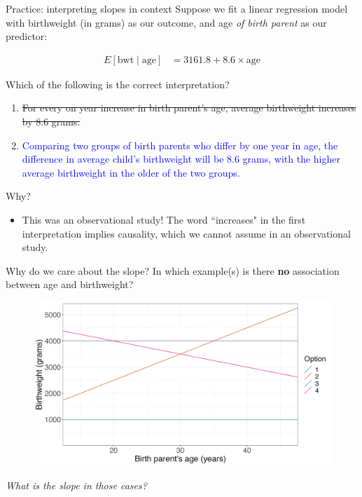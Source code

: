 \documentclass[10pt,t]{beamer}
\begin{document}
\begin{frame}{Practice: interpreting slopes in context}
Suppose we fit a linear regression model with birthweight (in grams) as our outcome, and age \textit{of birth parent} as our predictor:

\begin{align*}
E[\text{bwt} \mid \text{age}] & = 3161.8 + 8.6 \times \text{age}
\end{align*}

Which of the following is the correct interpretation?

\begin{enumerate}
	\item \sout{For every on year increase in birth parent's age, average birthweight increases by 8.6 grams.}
	\item \textcolor{blue}{Comparing two groups of birth parents who differ by one year in age, the difference in average child's birthweight will be 8.6 grams, with the higher average birthweight in the older of the two groups.}
\end{enumerate}\pause

Why?
\begin{itemize}
	\item[] This was an observational study! The word ``increases" in the first interpretation implies causality, which we cannot assume in an observational study.
\end{itemize}

\end{frame}

\begin{frame}{Why do we care about the slope?}
In which example(s) is there \textbf{no} association between age and birthweight?

\vspace{0.3cm}

\begin{figure}
\centering \includegraphics[scale=0.35]{zeroslopes.png}
\end{figure}\pause

\vspace{0.2cm}

\textit{What is the slope in those cases?}

\end{frame}
\end{document}
